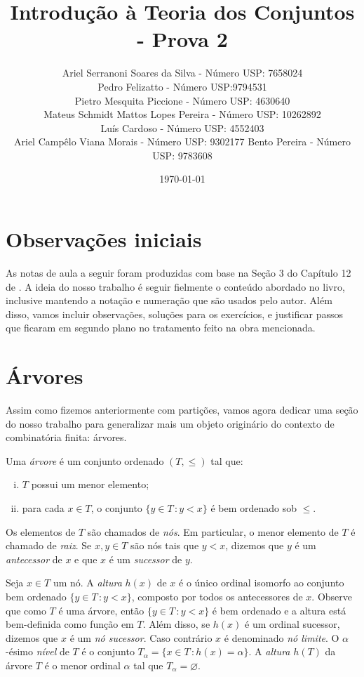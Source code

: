 \documentclass[a4paper]{article}
\title{Introdução à Teoria dos Conjuntos - Prova 2}
\author{Ariel Serranoni Soares da Silva  - Número USP: 7658024\\
Pedro Felizatto - Número USP:9794531\\
Pietro Mesquita Piccione - Número USP: 4630640\\
Mateus Schmidt Mattos Lopes Pereira - Número USP: 10262892\\
Luís Cardoso - Número USP: 4552403\\
Ariel Campêlo Viana Morais - Número USP: 9302177
Bento Pereira - Número USP: 9783608}
\date{\today}
\begin{document}
\maketitle
\section*{Observações iniciais}

As notas de aula a seguir foram produzidas com base na Seção 3 do Capítulo 12 de
\cite{jech}. A ideia do nosso trabalho é seguir fielmente o conteúdo abordado no
livro, inclusive mantendo a notação e numeração que são usados pelo autor.
Além disso, vamos incluir observações, soluções para os exercícios, e justificar
passos que ficaram em segundo plano no tratamento feito na obra mencionada.

\setcounter{section}{2}
\section{Árvores}

Assim como fizemos anteriormente com partições, vamos agora dedicar uma seção do
nosso trabalho para generalizar mais um objeto originário do
contexto de combinatória finita: árvores.

\begin{definition}
  Uma \emph{árvore} é um conjunto ordenado \((T,\leq)\) tal que:
 \begin{enumerate}[(i)]
  \item \(T\) possui um menor elemento;
  \item para cada \(x\in T\), o conjunto \(\{y\in T\,\colon y<x\}\) é bem
    ordenado sob \(\leq\).
  \end{enumerate}
\end{definition}
Os elementos de \(T\) são chamados de \emph{nós}. Em particular,
o menor elemento de \(T\) é chamado  de \emph{raiz}.
Se \(x,y\in T\) são nós tais que  \(y<x\), dizemos que \(y\) é um
\emph{antecessor} de \(x\) e que \(x\) é um \emph{sucessor} de \(y\).

Seja \(x\in T\) um nó.  A \emph{altura} \(h(x)\) de \(x\) é o único ordinal
isomorfo ao conjunto bem ordenado \mbox{\(\{y\in T\,\colon
y<x\}\),} composto por todos os antecessores de \(x\). Observe que como \(T\) é uma árvore,
então \(\{y\in T\,\colon y<x\}\) é bem ordenado e a altura está bem-definida como função em \(T\).
Além disso, se \(h(x)\) é um ordinal sucessor, dizemos que \(x\) é um
\emph{nó sucessor}. Caso contrário \(x\) é denominado \emph{nó limite}.
O \(\alpha\)-ésimo \emph{nível} de \(T\) é o conjunto
\(T_\alpha=\{x\in T \,\colon h(x)=\alpha\}\). A \emph{altura} \(h(T)\) da árvore
\(T\) é o menor ordinal \(\alpha\) tal que \(T_\alpha=\varnothing\).  
\end{document}
